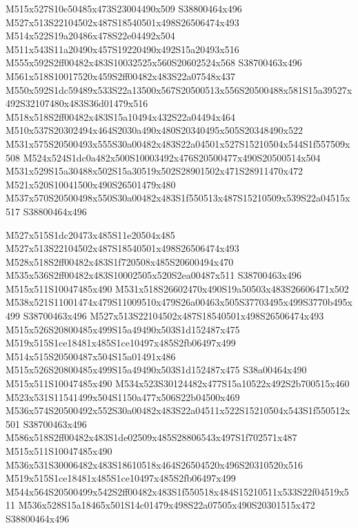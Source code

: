 \documentclass{article}
\begin{document}
\begin{multicols}{2}
M515x527S10e50485x473S23004490x509 S38800464x496 M527x513S22104502x487S18540501x498S26506474x493 M514x522S19a20486x478S22e04492x504 M511x543S11a20490x457S19220490x492S15a20493x516 M555x592S2ff00482x483S10032525x560S20602524x568 S38700463x496 M561x518S10017520x459S2ff00482x483S22a07548x437 M550x592S1dc59489x533S22a13500x567S20500513x556S20500488x581S15a39527x492S32107480x483S36d01479x516 M518x518S2ff00482x483S15a10494x432S22a04494x464 M510x537S20302494x464S2030a490x480S20340495x505S20348490x522 M531x575S20500493x555S30a00482x483S22a04501x527S15210504x544S1f557509x508 M524x524S1dc0a482x500S10003492x476S20500477x490S20500514x504 M531x529S15a30488x502S15a30519x502S28901502x471S28911470x472 M521x520S10041500x490S26501479x480 M537x570S20500498x550S30a00482x483S1f550513x487S15210509x539S22a04515x517 S38800464x496

M527x515S1dc20473x485S11e20504x485 M527x513S22104502x487S18540501x498S26506474x493 M528x518S2ff00482x483S1f720508x485S20600494x470 M535x536S2ff00482x483S10002505x520S2ea00487x511 S38700463x496 M515x511S10047485x490 M531x518S26602470x490S19a50503x483S26606471x502 M538x521S11001474x479S11009510x479S26a00463x505S37703495x499S3770b495x499 S38700463x496 M527x513S22104502x487S18540501x498S26506474x493 M515x526S20800485x499S15a49490x503S1d152487x475 M519x515S1ce18481x485S1ce10497x485S2fb06497x499 M514x515S20500487x504S15a01491x486 M515x526S20800485x499S15a49490x503S1d152487x475 S38a00464x490 M515x511S10047485x490 M534x523S30124482x477S15a10522x492S2b700515x460 M523x531S11541499x504S1150a477x506S22b04500x469 M536x574S20500492x552S30a00482x483S22a04511x522S15210504x543S1f550512x501 S38700463x496 M586x518S2ff00482x483S1de02509x485S28806543x497S1f702571x487 M515x511S10047485x490 M536x531S30006482x483S18610518x464S26504520x496S20310520x516 M519x515S1ce18481x485S1ce10497x485S2fb06497x499 M544x564S20500499x542S2ff00482x483S1f550518x484S15210511x533S22f04519x511 M536x528S15a18465x501S14c01479x498S22a07505x490S20301515x472 S38800464x496


\end{multicols}
\end{document}
